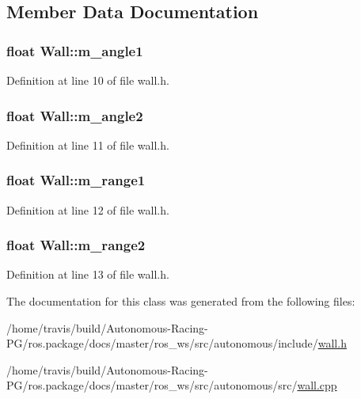 \subsection{Member Data Documentation}
\subsubsection[{\texorpdfstring{m\+\_\+angle1}{m_angle1}}]{\setlength{\rightskip}{0pt plus 5cm}float Wall\+::m\+\_\+angle1}\hypertarget{class_wall_aa55464f62abb57889a95936563a20671}{}\label{class_wall_aa55464f62abb57889a95936563a20671}


Definition at line 10 of file wall.\+h.

\subsubsection[{\texorpdfstring{m\+\_\+angle2}{m_angle2}}]{\setlength{\rightskip}{0pt plus 5cm}float Wall\+::m\+\_\+angle2}\hypertarget{class_wall_a1acb9bc37500a68c08db14c3659c3cd0}{}\label{class_wall_a1acb9bc37500a68c08db14c3659c3cd0}


Definition at line 11 of file wall.\+h.

\subsubsection[{\texorpdfstring{m\+\_\+range1}{m_range1}}]{\setlength{\rightskip}{0pt plus 5cm}float Wall\+::m\+\_\+range1}\hypertarget{class_wall_a56b11c6748405e939de7cf4f9fabdc2d}{}\label{class_wall_a56b11c6748405e939de7cf4f9fabdc2d}


Definition at line 12 of file wall.\+h.

\subsubsection[{\texorpdfstring{m\+\_\+range2}{m_range2}}]{\setlength{\rightskip}{0pt plus 5cm}float Wall\+::m\+\_\+range2}\hypertarget{class_wall_aeb7c600e6e41792c60498ca310c833f1}{}\label{class_wall_aeb7c600e6e41792c60498ca310c833f1}


Definition at line 13 of file wall.\+h.



The documentation for this class was generated from the following files\+:\begin{DoxyCompactItemize}
\item 
/home/travis/build/\+Autonomous-\/\+Racing-\/\+P\+G/ros.\+package/docs/master/ros\+\_\+ws/src/autonomous/include/\hyperlink{wall_8h}{wall.\+h}\item 
/home/travis/build/\+Autonomous-\/\+Racing-\/\+P\+G/ros.\+package/docs/master/ros\+\_\+ws/src/autonomous/src/\hyperlink{wall_8cpp}{wall.\+cpp}\end{DoxyCompactItemize}
